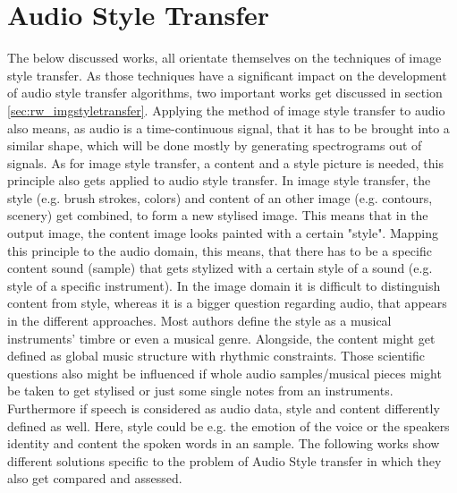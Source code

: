 \section{Audio Style Transfer}
\label{sec:rw_audio_style_transfer}
The below discussed works, all orientate themselves on the techniques of image style transfer. As those techniques have a significant impact on the development of audio style transfer algorithms, two important works get discussed in section \ref{sec:rw_imgstyletransfer}. Applying the method of image style transfer to audio also means, as audio is a time-continuous signal, that it has to be brought into a similar shape, which will be done mostly by generating spectrograms out of signals. As for image style transfer, a content and a style picture is needed, this principle also gets applied to audio style transfer. In image style transfer, the style (e.g. brush strokes, colors) and content of an other image (e.g. contours, scenery) get combined, to form a new stylised image. \cite{Gatys2016} This means that in the output image, the content image looks painted with a certain "style". Mapping this principle to the audio domain, this means, that there has to be a specific content sound (sample) that gets stylized with a certain style of a sound (e.g. style of a specific instrument). In the image domain it is difficult to distinguish content from style, whereas it is a bigger question regarding audio, that appears in the different approaches. Most authors define the style as a musical instruments' timbre or even a musical genre. Alongside, the content might get defined as global music structure with rhythmic constraints. \cite{Grinstein2018} Those scientific questions also might be influenced if whole audio samples/musical pieces might be taken to get stylised or just some single notes from an instruments. Furthermore if speech is considered as audio data, style and content differently defined as well. Here, style could be e.g. the emotion of the voice or the speakers identity and content the spoken words in an sample. The following works show different solutions specific to the problem of Audio Style transfer in which they also get compared and assessed. \\

